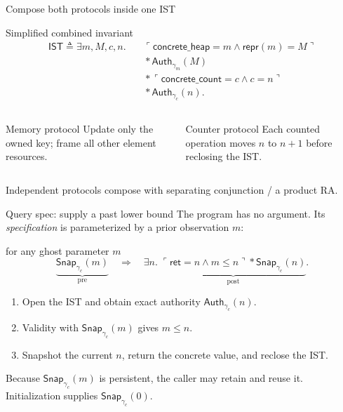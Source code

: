 \documentclass[aspectratio=169,10pt]{beamer}
\newcommand{\Sep}{\mathbin{*}}
\newcommand{\AuthM}[1]{\mathsf{Auth}_{\gamma_m}(#1)}
\newcommand{\AuthC}[1]{\mathsf{Auth}_{\gamma_c}(#1)}
\newcommand{\Snap}[1]{\mathsf{Snap}_{\gamma_c}(#1)}
\newcommand{\code}[1]{\texttt{\detokenize{#1}}}
\begin{document}
\begin{frame}{Compose both protocols inside one IST}
  \small
  \begin{block}{Simplified combined invariant}
  \[
  \begin{aligned}
  \mathsf{IST}\triangleq\exists m,M,c,n.\quad
    &\ulcorner\mathsf{concrete\_heap}=m\land\mathsf{repr}(m)=M\urcorner \\
    &{}\Sep \AuthM{M} \\
    &{}\Sep \ulcorner\mathsf{concrete\_count}=c\land c=n\urcorner \\
    &{}\Sep \AuthC{n}.
  \end{aligned}
  \]
  \end{block}

  \begin{columns}[T,onlytextwidth]
      \begin{exampleblock}{Memory protocol}
        Update only the owned key; frame all other element resources.
      \end{exampleblock}
      \begin{exampleblock}{Counter protocol}
        Each counted operation moves \(n\) to \(n+1\) before reclosing the IST.
      \end{exampleblock}
  \end{columns}

  \begin{center}
    Independent protocols compose with separating conjunction / a product RA.
  \end{center}
\end{frame}

\begin{frame}{Query spec: supply a past lower bound}
  The program has no argument. Its \emph{specification} is parameterized by a prior observation \(m\):

  \vspace{0.3cm}
  \begin{block}{\code{get_count()} for any ghost parameter \(m\)}
    \[
      \underbrace{\Snap{m}}_{\text{pre}}
      \quad\Longrightarrow\quad
      \exists n.\;
        \underbrace{\ulcorner\mathsf{ret}=n\land m\le n\urcorner\Sep\Snap{n}}_{\text{post}}.
    \]
  \end{block}

  \begin{enumerate}
    \item Open the IST and obtain exact authority \(\AuthC{n}\).
    \item Validity with \(\Snap{m}\) gives \(m\le n\).
    \item Snapshot the current \(n\), return the concrete value, and reclose the IST.
  \end{enumerate}

  \small Because \(\Snap{m}\) is persistent, the caller may retain and reuse it. Initialization supplies \(\Snap{0}\).
\end{frame}
\end{document}
